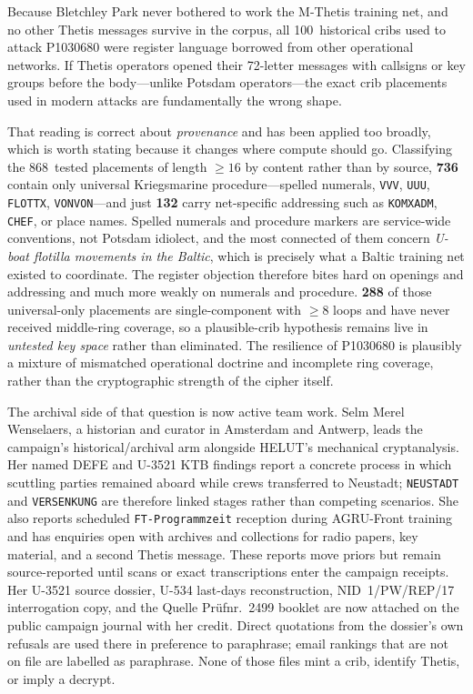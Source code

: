 \documentclass[11pt,a4paper]{article}
\begin{document}
Because Bletchley Park never bothered to work the M-Thetis training net,
and no other Thetis messages survive in the corpus, all 100~historical
cribs used to attack P1030680 were register language borrowed from other
operational networks.
If Thetis operators opened their 72-letter messages with callsigns or key
groups before the body---unlike Potsdam operators---the exact crib
placements used in modern attacks are fundamentally the wrong shape.

That reading is correct about \emph{provenance} and has been applied too
broadly, which is worth stating because it changes where compute should
go. Classifying the 868~tested placements of length ${\ge}16$ by content
rather than by source, \textbf{736} contain only universal Kriegsmarine
procedure---spelled numerals, \texttt{VVV}, \texttt{UUU},
\texttt{FLOTTX}, \texttt{VONVON}---and just \textbf{132} carry
net-specific addressing such as \texttt{KOMXADM}, \texttt{CHEF}, or place
names. Spelled numerals and procedure markers are service-wide
conventions, not Potsdam idiolect, and the most connected of them concern
\emph{U-boat flotilla movements in the Baltic}, which is precisely what a
Baltic training net existed to coordinate. The register objection
therefore bites hard on openings and addressing and much more weakly on
numerals and procedure. \textbf{288} of those universal-only placements
are single-component with ${\ge}8$ loops and have never received
middle-ring coverage, so a plausible-crib hypothesis remains live in
\emph{untested key space} rather than eliminated.
The resilience of P1030680 is plausibly a mixture of mismatched
operational doctrine and incomplete ring coverage, rather than the
cryptographic strength of the cipher itself.

The archival side of that question is now active team work. Selm Merel
Wenselaers, a historian and curator in Amsterdam and Antwerp, leads the
campaign's historical/archival arm alongside HELUT's mechanical cryptanalysis.
Her named DEFE and U-3521 KTB findings report a concrete process in which
scuttling parties remained aboard while crews transferred to Neustadt;
\texttt{NEUSTADT} and \texttt{VERSENKUNG} are therefore linked stages rather
than competing scenarios. She also reports scheduled \texttt{FT-Programmzeit}
reception during AGRU-Front training and has enquiries open with archives and
collections for radio papers, key material, and a second Thetis message. These
reports move priors but remain source-reported until scans or exact
transcriptions enter the campaign receipts.
Her U-3521 source dossier, U-534 last-days reconstruction, NID~1/PW/REP/17
interrogation copy, and the Quelle Prüfnr.\ 2499 booklet are now attached on
the public campaign journal with her credit. Direct quotations from the
dossier's own refusals are used there in preference to paraphrase; email
rankings that are not on file are labelled as paraphrase. None of those
files mint a crib, identify Thetis, or imply a decrypt.
\end{document}

